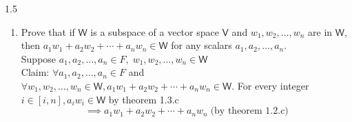 \documentclass[letterpaper,12pt]{article}
\newcommand{\?}{\stackrel{?}{=}}
\begin{document}
\begin{spacing}{1.5}
\begin{enumerate}
\begin{enumerate}[(a)]
Claim: $\left(ca_1,ca_2,\dots,ca_n\right) \in \mathsf{W}_2$
\begin{equation}
c\left(a_1,a_2,\dots,a_n\right) = \left(ca_1,ca_2,\dots,ca_n\right)
\end{equation}
\begin{equation}
\sum\limits_{k=1}^n \left(ca_k\right) = c\sum\limits_{k=1}^n
\left(a_k\right) = 0
\end{equation}
\begin{equation}
\therefore \left(ca_1,ca_2,\dots,ca_n+\right) \in \mathsf{W}_1
\end{equation}
\end{enumerate}
\newpage{}
Suppose
$\left(a_1,a_2,\dots,a_n\right),\left(b_1,b_2,\dots,b_n\right) \in \mathsf{W}_2$
\\
Claim: $\left(a_1+b_1,a_1+b_2,\dots,a_n+b_n\right) \notin
\mathsf{W}_2\right)$
\begin{equation}
\left(a_1,a_2,\dots,a_n\right + \left(b_1,b_2,\dots,b_n\right) = \left(a_1+b_1,a_2+b_2,\dots,a_n+b_n\right)
\end{equation}
\begin{equation}
\sum\limits_{k=1}^n\left(a_k\right) +
\sum\limits_{k=1}^n\left(b_k\right) = \sum\limits_{k=1}^n\left(a_k +
  b_k\right) = 2
\end{equation}
\begin{equation}
\therefore \left(a_1+b_1,a_2+b_2,\dots,a_n+b_n\right) \notin \mathsf{W}_2
\end{equation}
\setcounter{enumi}{19}
\item Prove that if $\mathsf{W}$ is a subspace of a vector space $\mathsf{V}$ and
  $w_1, w_2,\dots,w_n$ are in $\mathsf{W}$, then $a_1w_1 + a_2w_2 +
  \cdots + a_nw_n \in \mathsf{W}$ for any scalars $a_1,a_2,\dots,a_n$.
\\
Suppose $a_1,a_2,\dots,a_n \in F,\; w_1,w_2,\dots,w_n \in \mathsf{W}$
\\
Claim: $\forall a_1,a_2,\dots,a_n \in F$ and $\forall
w_1,w_2,\dots,w_n \in \mathsf{W}, a_1w_1 + a_2w_2+\cdots+a_nw_n\in
\mathsf{W}$.
For every integer $i \in \left[i,n\right], a_iw_i \in \mathsf{W}$ by
theorem 1.3.c
\begin{equation}
\implies a_1w_1 + a_2w_2 +\cdots+a_nw_n\; \text{(by theorem 1.2.c)}
\end{equation}


\end{enumerate}
\end{spacing}
\end{document}
